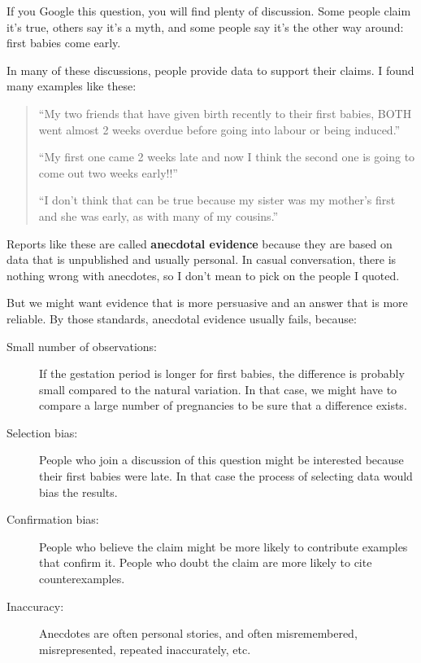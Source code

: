 \documentclass[12pt]{book}
\begin{document}
If you Google this question, you will find plenty of discussion.
Some people claim it's true, others say it's a myth, and some people
say it's the other way around: first babies come early.

In many of these discussions, people provide data to support their
claims.  I found many examples like these:

\begin{quote}

``My two friends that have given birth recently to their first babies,
BOTH went almost 2 weeks overdue before going into labour or being
induced.''

``My first one came 2 weeks late and now I think the second one is
going to come out two weeks early!!''

``I don't think that can be true because my sister was my mother's
first and she was early, as with many of my cousins.''

\end{quote}

Reports like these are called {\bf anecdotal evidence} because they
are based on data that is unpublished and usually personal.  In casual
conversation, there is nothing wrong with anecdotes, so I don't mean
to pick on the people I quoted.

But we might want evidence that is more persuasive and
an answer that is more reliable.  By those standards, anecdotal
evidence usually fails, because:

\begin{description}

\item[Small number of observations:] If the gestation period is longer
  for first babies, the difference is probably small compared to the
  natural variation.  In that case, we might have to compare a large
  number of pregnancies to be sure that a difference exists.

\item[Selection bias:] People who join a discussion of this question
  might be interested because their first babies were late.  In that
  case the process of selecting data would bias the results.

\item[Confirmation bias:] People who believe the claim might be more
  likely to contribute examples that confirm it.  People who doubt the
  claim are more likely to cite counterexamples.

\item[Inaccuracy:] Anecdotes are often personal stories, and often
  misremembered, misrepresented, repeated
  inaccurately, etc.

\end{description}
\end{document}
